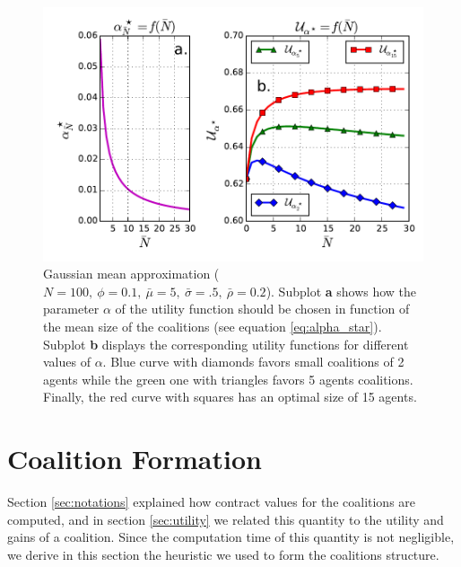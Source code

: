 \documentclass[journal]{IEEEtran}
\begin{document}
\begin{figure}
\includegraphics[scale=.48]{./figs/figure_2}
\caption{{\footnotesize Gaussian mean approximation ($N=100,\ \phi=0.1,\ \bar{\mu}=5,\ \bar{\sigma}=.5,\ \bar{\rho}=0.2 $). Subplot \textbf{a} shows how the parameter $ \alpha $ of the utility function should be chosen in function of the mean size of the coalitions (see equation \ref{eq:alpha_star}). Subplot \textbf{b} displays the corresponding utility functions for different values of $ \alpha $. Blue curve with diamonds favors small coalitions of 2 agents while the green one with triangles favors 5 agents coalitions. Finally, the red curve with squares has an optimal size of 15 agents.} }
\label{fig:mean_approx}
\end{figure}

%
%
\section{Coalition Formation}
\label{sec:forming}
Section \ref{sec:notations} explained how contract values for the coalitions are computed, and in section \ref{sec:utility} we related this quantity to the utility and gains of a coalition. Since the computation time of this quantity is not negligible, we derive in this section the heuristic we used to form the coalitions structure. 
\end{document}
